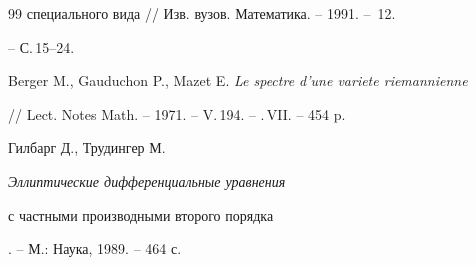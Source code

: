 \begin{thebibliography}{99}
{специального вида} // Изв. вузов. Математика. -- 1991. -- \No\,12.


-- С.\,15--24.




Berger M., Gauduchon P., Mazet E. {\em Le spectre d'une variete riemannienne}


// Lect. Notes Math. -- 1971. -- V.\,194. -- \No.\,VII. -- 454 p.




Гилбарг Д., Трудингер М. {\em Эллиптические дифференциальные уравнения


с частными производными второго порядка}. -- М.: Наука, 1989. -- 464 с.





\end{thebibliography} 


 


\vskip 2cm 


 






\label{end} 


 


